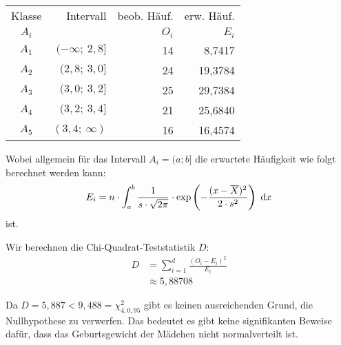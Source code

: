 \documentclass[main.tex]{subfiles}
\begin{document}
\begin{center}
\begin{tabular}{c|r|r|r}
Klasse & Intervall            & beob. Häuf. & erw. Häuf.\\
$A_i$  &                      & $O_i$             & $E_i$ \\\hline
$A_1$  & $(-\infty;\ 2,8   ]$ & 14                &  8,7417 \\
$A_2$  & $(    2,8;\ 3,0   ]$ & 24                & 19,3784 \\
$A_3$  & $(    3,0;\ 3,2   ]$ & 25                & 29,7384 \\
$A_4$  & $(    3,2;\ 3,4   ]$ & 21                & 25,6840 \\
$A_5$  & $(    3,4;\ \infty)$ & 16                & 16,4574 \\
\end{tabular}
\end{center}

Wobei allgemein für das Intervall $A_i = (a; b]$ die erwartete Häufigkeit wie folgt berechnet werden kann:
$$
    E_i = n \cdot \int_{a}^{b} \frac{1}{s\cdot \sqrt{2\pi}} \cdot \exp\left(-\frac{(x-\overline{X})^2}{2\cdot s^2} \right) ~\mathrm{d}x
$$
ist.

Wir berechnen die Chi-Quadrat-Teststatistik $D$:
$$\begin{aligned}
    D &= \sum_{i=1}^{d} \frac{(O_i - E_i)^2}{E_i} \\[2mm]
    &\approx 5,88708
\end{aligned}$$

Da $D = 5,887 < 9,488 = \chi^2_{4, 0,95}$ gibt es keinen ausreichenden Grund, die Nullhypothese zu verwerfen. Das bedeutet es gibt keine signifikanten Beweise dafür, dass das Geburtsgewicht der Mädchen nicht normalverteilt ist.
\end{document}
